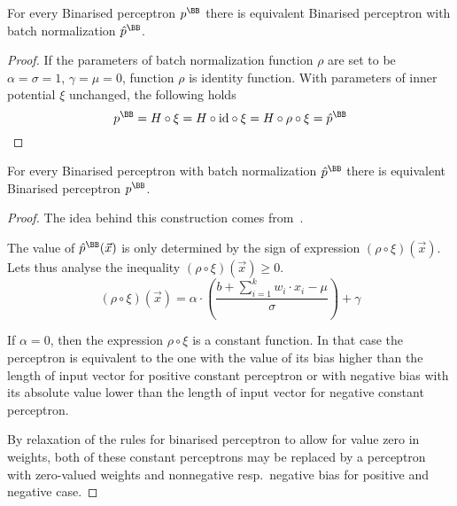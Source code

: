 \begin{lemma}{For every Binarised perceptron $p^\BB$ there is equivalent Binarised perceptron with batch normalization $\hat p^\BB$.}
\begin{proof}
If the parameters of batch normalization function $\rho$ are set to be
$\alpha=\sigma=1$, $\gamma=\mu=0$, function $\rho$ is identity function.
With parameters of inner potential $\xi$ unchanged, the following holds
\begin{equation*}
	p^\BB = H \circ \xi = H \circ \text{id} \circ \xi = H\circ\rho\circ\xi = \hat{p}^\BB
\end{equation*}
\end{proof}
\end{lemma}

\begin{lemma}For every Binarised perceptron with batch normalization $\hat p^\BB$ there is equivalent Binarised perceptron $p^\BB$.\label{lem:batch_perceptron}
\begin{proof}
The idea behind this construction comes from~\cite{zhang2021bdd4bnn}.

The value of $\hat{p}^\BB(\vec x)$ is only determined by the sign of expression
$(\rho \circ \xi)(\vec x)$. Lets thus analyse the inequality
$(\rho\circ\xi)(\vec x) \geq 0$.
\begin{equation*}
	(\rho \circ \xi)(\vec x) = \alpha\cdot \left(\frac{
		b + \sum_{i=1}^k w_i\cdot x_i
	-\mu}{\sigma}\right) + \gamma
\end{equation*}

If $\alpha = 0$, then the expression $\rho\circ\xi$ is a constant function. In that case
the perceptron is equivalent to the one with the value of its bias higher than the length
of input vector for positive constant perceptron or with negative bias with its absolute
value lower than the length of input vector for negative constant perceptron.

By relaxation of the rules for binarised perceptron to allow for value zero in weights,
both of these constant perceptrons may be replaced by a perceptron with zero-valued
weights and nonnegative resp.\ negative bias for positive and negative case.


\end{proof}
\end{lemma}
